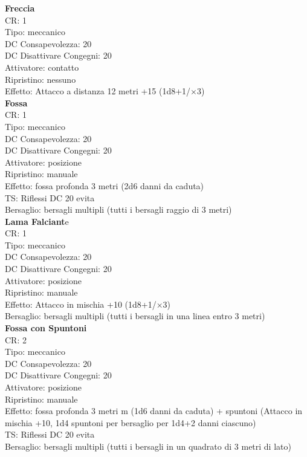 \documentclass[a4paper,11pt,twoside,openany]{book}
\begin{document}
{\begin{multicols}{2}
			\textbf{Freccia}\\
			CR: 1 \\
			Tipo: meccanico \\
			DC Consapevolezza: 20 \\
			DC Disattivare Congegni: 20 \\
			Attivatore: contatto \\
			Ripristino: nessuno \\
			Effetto: Attacco a distanza 12 metri +15 (1d8+1/×3)\\
			
			\textbf{Fossa}\\
			CR: 1 \\
			Tipo: meccanico \\
			DC Consapevolezza: 20 \\
			DC Disattivare Congegni: 20 \\
			Attivatore: posizione \\
			Ripristino: manuale \\
			Effetto: fossa profonda 3 metri (2d6 danni da caduta) \\
			TS: Riflessi DC 20 evita \\
			Bersaglio: bersagli multipli (tutti i bersagli raggio di 3 metri)\\
			
			\textbf{Lama Falciant}e\\
			CR: 1 \\
			Tipo: meccanico \\
			DC Consapevolezza: 20 \\
			DC Disattivare Congegni: 20 \\
			Attivatore: posizione \\
			Ripristino: manuale \\
			Effetto: Attacco in mischia +10 (1d8+1/×3) \\
			Bersaglio: bersagli multipli (tutti i bersagli in una linea entro 3 metri)\\
			
			\textbf{Fossa con Spuntoni}\\
			CR: 2 \\
			Tipo: meccanico \\
			DC Consapevolezza: 20 \\
			DC Disattivare Congegni: 20 \\
			Attivatore: posizione \\
			Ripristino: manuale \\
			Effetto: fossa profonda 3 metri m (1d6 danni da caduta) + spuntoni (Attacco in mischia +10, 1d4 spuntoni per bersaglio per 1d4+2 danni ciascuno) \\
			TS: Riflessi DC 20 evita \\
			Bersaglio: bersagli multipli (tutti i bersagli in un quadrato di 3 metri di lato)\\
			

\end{multicols}}
\end{document}

